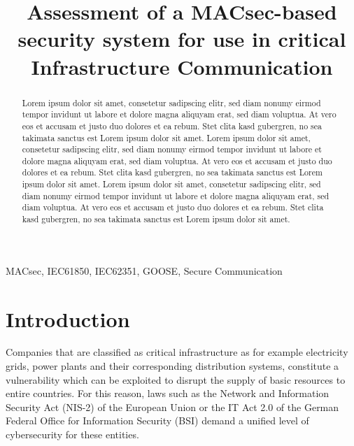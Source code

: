 \documentclass[conference]{IEEEtran}
\begin{document}
\title{Assessment of a MACsec-based security system for use in critical Infrastructure Communication}

\author{
}

\maketitle

\begin{abstract}
    Lorem ipsum dolor sit amet, consetetur sadipscing elitr, sed diam nonumy eirmod tempor invidunt ut labore et dolore magna aliquyam erat, sed diam 
    voluptua. At vero eos et accusam et justo duo dolores et ea rebum. Stet clita kasd gubergren, no sea takimata sanctus est Lorem ipsum dolor sit 
    amet. Lorem ipsum dolor sit amet, consetetur sadipscing elitr, sed diam nonumy eirmod tempor invidunt ut labore et dolore magna aliquyam erat, sed 
    diam voluptua. At vero eos et accusam et justo duo dolores et ea rebum. Stet clita kasd gubergren, no sea takimata sanctus est Lorem ipsum dolor 
    sit amet. Lorem ipsum dolor sit amet, consetetur sadipscing elitr, sed diam nonumy eirmod tempor invidunt ut labore et dolore magna aliquyam erat, 
    sed diam voluptua. At vero eos et accusam et justo duo dolores et ea rebum. Stet clita kasd gubergren, no sea takimata sanctus est Lorem ipsum dolor 
    sit amet.
\end{abstract}

\begin{IEEEkeywords}
    MACsec, IEC61850, IEC62351, GOOSE, Secure Communication
\end{IEEEkeywords}

\section{Introduction}
Companies that are classified as critical infrastructure as for example electricity grids, power plants and their corresponding distribution systems, 
constitute a vulnerability which can be exploited to disrupt the supply of basic resources to entire countries. For this reason, laws such as the Network 
and Information Security Act (NIS-2) \cite{NIS-2:2022} of the European Union or the IT Act 2.0 \cite{IT-Gesetz_2:2021} of the German Federal Office for 
Information Security (BSI) demand a unified level of cybersecurity for these entities. 
\end{document}
